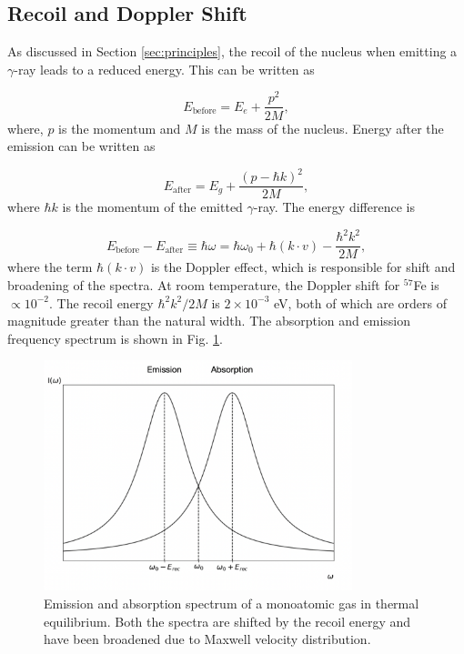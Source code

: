 \documentclass[a4paper]{report}
\numberwithin{equation}{section}
\begin{document}
\subsection{Recoil and Doppler Shift}

As discussed in Section \ref{sec:principles}, the recoil of the nucleus when emitting a $\gamma$-ray leads to a reduced energy. This can be written as

\begin{equation}
		E_{\mathrm{before}} = E_{e} + \frac{p^2}{2M},
\end{equation}
where, $p$ is the momentum and $M$ is the mass of the nucleus. Energy after the emission can be written as

\begin{equation}
		E_{\mathrm{after}} = E_{g} + \frac{(p - \hbar k)^2}{2M},
\end{equation}
where $\hbar k$ is the momentum of the emitted $\gamma$-ray. The energy difference is 

\begin{equation}
		E_{\mathrm{before}} - E_{\mathrm{after}} \equiv \hbar \omega = \hbar \omega_{0} + \hbar (k \cdot v) - \frac{\hbar ^2 k^2}{2M},
\end{equation}
where the term $\hbar (k \cdot v)$ is the Doppler effect, which is responsible for shift and broadening of the spectra. At room temperature, the Doppler shift for $^{57}$Fe is $\propto 10^{-2}$. The recoil energy $\hbar ^2 k^2 / 2M$ is $2 \times 10^{-3}$ eV, both of which are orders of magnitude greater than the natural width. The absorption and emission frequency spectrum is shown in Fig. \ref{fig:doppler}.

\begin{figure}[htpb]
    \centering
    \includegraphics[width=0.8\textwidth]{doppler}
    \caption{Emission and absorption spectrum of a monoatomic gas in thermal equilibrium. Both the spectra are shifted by the recoil energy and have been broadened due to Maxwell velocity distribution.}
    \label{fig:doppler}
\end{figure}
\end{document}
